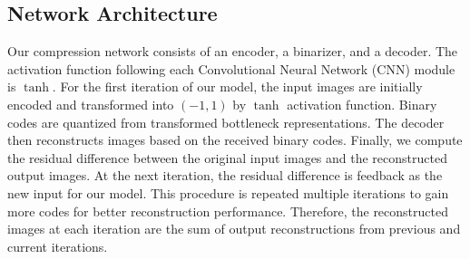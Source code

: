 \documentclass[10pt,twocolumn,letterpaper]{article}
\begin{document}
\subsection{Network Architecture}
Our compression network consists of an encoder, a binarizer, and a decoder. The activation function following each Convolutional Neural Network (CNN) module is $\tanh$. For the first iteration of our model, the input images are initially encoded and transformed into $(-1,1)$ by $\tanh$ activation function. Binary codes are quantized from transformed bottleneck representations. The decoder then reconstructs images based on the received binary codes. Finally, we compute the residual difference between the original input images and the reconstructed output images. At the next iteration, the residual difference is feedback as the new input for our model. This procedure is repeated multiple iterations to gain more codes for better reconstruction performance. Therefore, the reconstructed images at each iteration are the sum of output reconstructions from previous and current iterations.
\end{document}
